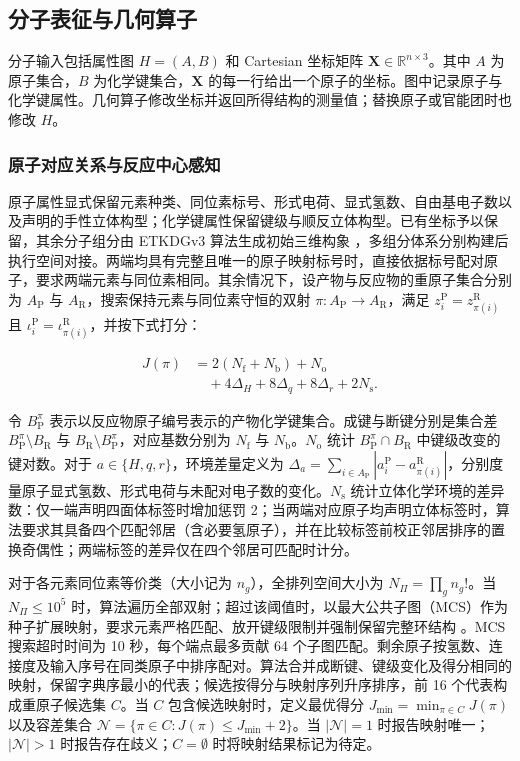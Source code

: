 \subsection{分子表征与几何算子}
分子输入包括属性图 $H=(A,B)$ 和 Cartesian 坐标矩阵 $\mathbf{X}\in\mathbb{R}^{n\times 3}$。其中 $A$ 为原子集合，$B$ 为化学键集合，$\mathbf{X}$ 的每一行给出一个原子的坐标。图中记录原子与化学键属性。几何算子修改坐标并返回所得结构的测量值；替换原子或官能团时也修改 $H$。

\subsubsection{原子对应关系与反应中心感知}
原子属性显式保留元素种类、同位素标号、形式电荷、显式氢数、自由基电子数以及声明的手性立体构型；化学键属性保留键级与顺反立体构型。已有坐标予以保留，其余分子组分由 ETKDGv3 算法生成初始三维构象 \citep{ref12,etkdg2020,ref13}，多组分体系分别构建后执行空间对接。两端均具有完整且唯一的原子映射标号时，直接依据标号配对原子，要求两端元素与同位素相同。其余情况下，设产物与反应物的重原子集合分别为 $A_{\mathrm{P}}$ 与 $A_{\mathrm{R}}$，搜索保持元素与同位素守恒的双射 $\pi:A_{\mathrm{P}}\to A_{\mathrm{R}}$，满足 $z_i^{\mathrm{P}}=z_{\pi(i)}^{\mathrm{R}}$ 且 $\iota_i^{\mathrm{P}}=\iota_{\pi(i)}^{\mathrm{R}}$，并按下式打分：

\begin{equation}\label{eq:methods-01}
\begin{aligned}
J(\pi)&=2(N_{\mathrm{f}}+N_{\mathrm{b}})+N_{\mathrm{o}}\\
&\quad{}+4\Delta_H+8\Delta_q+8\Delta_r+2N_{\mathrm{s}}.
\end{aligned}
\end{equation}

令 $B_{\mathrm{P}}^\pi$ 表示以反应物原子编号表示的产物化学键集合。成键与断键分别是集合差 $B_{\mathrm{P}}^\pi\setminus B_{\mathrm{R}}$ 与 $B_{\mathrm{R}}\setminus B_{\mathrm{P}}^\pi$，对应基数分别为 $N_{\mathrm{f}}$ 与 $N_{\mathrm{b}}$。$N_{\mathrm{o}}$ 统计 $B_{\mathrm{P}}^\pi\cap B_{\mathrm{R}}$ 中键级改变的键对数。对于 $a\in\{H,q,r\}$，环境差量定义为 $\Delta_a=\sum_{i\in A_{\mathrm{P}}}|a_i^{\mathrm{P}}-a_{\pi(i)}^{\mathrm{R}}|$，分别度量原子显式氢数、形式电荷与未配对电子数的变化。$N_{\mathrm{s}}$ 统计立体化学环境的差异数：仅一端声明四面体标签时增加惩罚 2；当两端对应原子均声明立体标签时，算法要求其具备四个匹配邻居（含必要氢原子），并在比较标签前校正邻居排序的置换奇偶性；两端标签的差异仅在四个邻居可匹配时计分。

对于各元素同位素等价类（大小记为 $n_g$），全排列空间大小为 $N_\Pi=\prod_g n_g!$。当 $N_\Pi\le 10^5$ 时，算法遍历全部双射；超过该阈值时，以最大公共子图（MCS）作为种子扩展映射，要求元素严格匹配、放开键级限制并强制保留完整环结构 \citep{ref13}。MCS 搜索超时时间为 10 秒，每个端点最多贡献 64 个子图匹配。剩余原子按氢数、连接度及输入序号在同类原子中排序配对。算法合并成断键、键级变化及得分相同的映射，保留字典序最小的代表；候选按得分与映射序列升序排序，前 16 个代表构成重原子候选集 $C$。当 $C$ 包含候选映射时，定义最优得分 $J_{\min}=\min_{\pi\in C}J(\pi)$ 以及容差集合 $\mathcal{N}=\{\pi\in C:J(\pi)\le J_{\min}+2\}$。当 $|\mathcal{N}|=1$ 时报告映射唯一；$|\mathcal{N}|>1$ 时报告存在歧义；$C=\emptyset$ 时将映射结果标记为待定。

